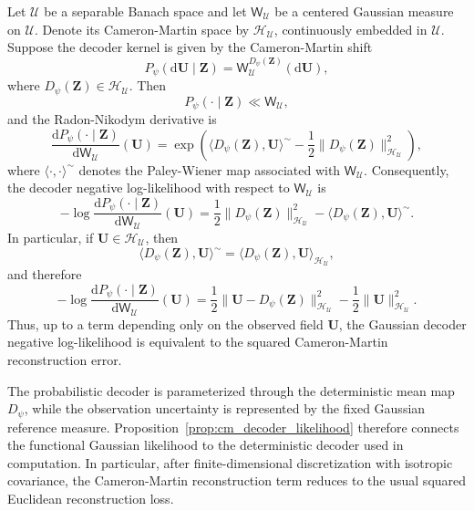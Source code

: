 \documentclass[11pt]{article}
\renewcommand{\d}{\mathrm{d}}
\begin{document}
\begin{proposition}
\label{prop:cm_decoder_likelihood}
Let $\mathcal U$ be a separable Banach space and let $\mathsf W_{\mathcal U}$ be a centered Gaussian measure on $\mathcal U$. Denote its Cameron-Martin space by $\mathcal H_{\mathcal U}$, continuously embedded in $\mathcal U$. Suppose the decoder kernel is given by the
Cameron-Martin shift
\[
    P_\psi(\d\mathbf U\mid \mathbf Z)
    =
    \mathsf W_{\mathcal U}^{D_\psi(\mathbf Z)}(\d\mathbf U),
\]
where $D_\psi(\mathbf Z)\in \mathcal H_{\mathcal U}$.
Then
\[
    P_\psi(\cdot\mid \mathbf Z)\ll \mathsf W_{\mathcal U},
\]
and the Radon-Nikodym derivative is
\begin{equation}
\frac{\d P_\psi(\cdot\mid \mathbf Z)}{\d\mathsf W_{\mathcal U}
}(\mathbf U)
=\exp\left(\langle D_\psi(\mathbf Z),\mathbf U\rangle^\sim
-\frac12\|D_\psi(\mathbf Z)\|_{\mathcal H_{\mathcal U}}^2
\right),\label{eq:cm_decoder_rn}
\end{equation}
where $\langle\cdot,\cdot\rangle^\sim$ denotes the Paley-Wiener map associated with $\mathsf W_{\mathcal U}$. Consequently, the decoder negative log-likelihood with respect to
$\mathsf W_{\mathcal U}$ is
\begin{equation}
-\log\frac{\d P_\psi(\cdot\mid \mathbf Z)}{\d\mathsf W_{\mathcal U}}(\mathbf U)
    =
    \frac12
    \|D_\psi(\mathbf Z)\|_{\mathcal H_{\mathcal U}}^2
    -
    \langle D_\psi(\mathbf Z),\mathbf U\rangle^\sim.
    \label{eq:cm_decoder_nll}
\end{equation}
In particular, if $\mathbf U\in \mathcal H_{\mathcal U}$, then
\[
    \langle D_\psi(\mathbf Z),\mathbf U\rangle^\sim=
    \langle D_\psi(\mathbf Z),\mathbf U\rangle_{\mathcal H_{\mathcal U}},
\]
and therefore
\begin{equation}
-\log\frac{\d P_\psi(\cdot\mid \mathbf Z)}{\d\mathsf W_{\mathcal U}}(\mathbf U)
=
\frac12\|\mathbf U-D_\psi(\mathbf Z)\|_{\mathcal H_{\mathcal U}}^2-\frac12\|\mathbf U\|_{\mathcal H_{\mathcal U}}^2.
\label{eq:cm_decoder_squared_norm}
\end{equation}
Thus, up to a term depending only on the observed field $\mathbf U$, the Gaussian decoder negative log-likelihood is equivalent to the squared Cameron-Martin reconstruction error.
\end{proposition}

\begin{remark}
The probabilistic decoder is parameterized through the deterministic mean map $D_\psi$, while the observation uncertainty is represented by the fixed Gaussian reference measure. Proposition~\ref{prop:cm_decoder_likelihood}
therefore connects the functional Gaussian likelihood to the deterministic decoder used in computation. In particular, after finite-dimensional discretization with isotropic covariance, the Cameron-Martin reconstruction
term reduces to the usual squared Euclidean  reconstruction loss.
\end{remark}
\end{document}
